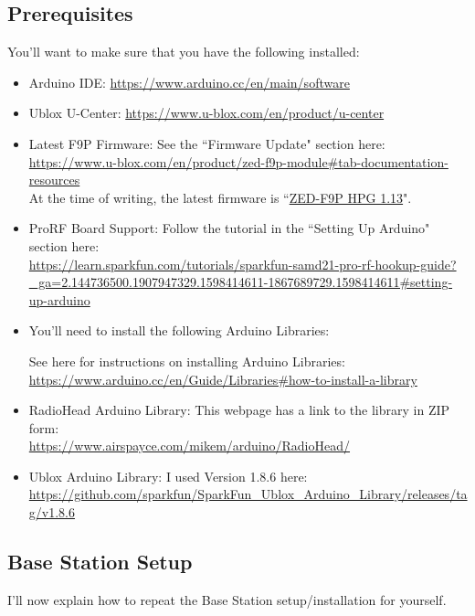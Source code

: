 \documentclass{article}%
\begin{document}
\subsection{Prerequisites}
You'll want to make sure that you have the following installed:
\begin{itemize}
	\item Arduino IDE: \url{https://www.arduino.cc/en/main/software}
	\item Ublox U-Center: \url{https://www.u-blox.com/en/product/u-center}
	\item Latest F9P Firmware: See the ``Firmware Update" section here: \\ \url{https://www.u-blox.com/en/product/zed-f9p-module#tab-documentation-resources} \\ At the time of writing, the latest firmware is ``\href{https://www.u-blox.com/en/ubx-viewer/view/UBX\_F9\_100\_HPG\_113\_ZED\_F9P.7e6e899c5597acddf2f5f2f70fdf5fbe.bin?url=https\%3A\%2F\%2Fwww.u-blox.com\%2Fsites\%2Fdefault\%2Ffiles\%2FUBX\_F9\_100\_HPG\_113\_ZED\_F9P.7e6e899c5597acddf2f5f2f70fdf5fbe.bin}{ZED-F9P HPG 1.13}". 
	\item ProRF Board Support: Follow the tutorial in the ``Setting Up Arduino" section here: \\ \url{https://learn.sparkfun.com/tutorials/sparkfun-samd21-pro-rf-hookup-guide?_ga=2.144736500.1907947329.1598414611-1867689729.1598414611#setting-up-arduino}
	\item You'll need to install the following Arduino Libraries:
	\begin{myquote}
	See here for instructions on installing Arduino Libraries: \\ \url{https://www.arduino.cc/en/Guide/Libraries#how-to-install-a-library}	
	\end{myquote}

		\item RadioHead Arduino Library: This webpage has a link to the library in ZIP form: \\ \url{https://www.airspayce.com/mikem/arduino/RadioHead/}
		\item Ublox Arduino Library: I used Version 1.8.6 here: \\ \url{https://github.com/sparkfun/SparkFun_Ublox_Arduino_Library/releases/tag/v1.8.6}
\end{itemize}

\subsection{Base Station Setup}
I'll now explain how to repeat the Base Station setup/installation for yourself.
\end{document}
